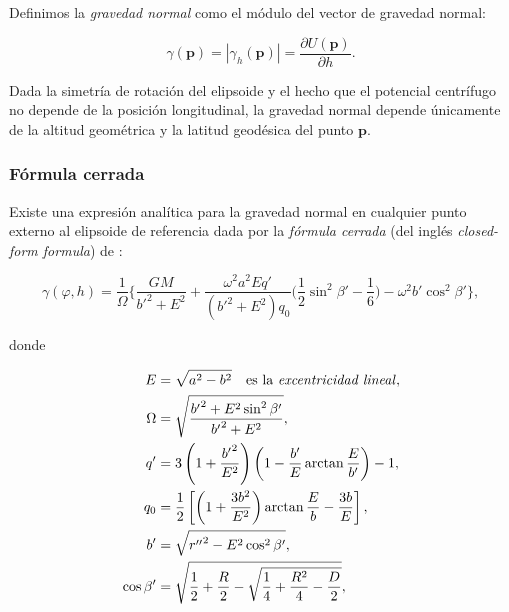 Definimos la \emph{gravedad normal} como el módulo del vector de gravedad
normal:

\begin{equation}
    \gamma(\mathbf{p}) = | \gamma_h(\mathbf{p}) | =
        \frac{\partial U(\mathbf{p})}{\partial h}.
\end{equation}

Dada la simetría de rotación del elipsoide y el hecho que el potencial
centrífugo no depende de la posición longitudinal, la gravedad normal depende
únicamente de la altitud geométrica y la latitud geodésica del punto
$\mathbf{p}$.

\subsubsection{Fórmula cerrada}

Existe una expresión analítica para la gravedad normal en cualquier punto
externo al elipsoide de referencia dada por la \emph{fórmula cerrada} (del
inglés \emph{closed-form formula}) de \citet{li2001}:


\begin{equation}
    \gamma(\varphi, h) =
    \frac{1}{\Omega}
    \Bigg\{
        \frac{G M}{{b'}^2 + E^2}
        + \frac{\omega^2 a^2 E q'}{({b'}^2 + E^2) q_0}
        \Bigg(
            \frac{1}{2}
            \sin^2 \beta' - \frac{1}{6}
        \Bigg)
        - \omega^2 b' \cos^2 \beta'
    \Bigg\},
    \label{eq:normal-gravity-closed-form}
\end{equation}

\noindent donde

\begin{align}
    E &= \sqrt{a^2 - b^2}
        \quad \text{es la \emph{excentricidad lineal}}, \\
    \Omega &= \sqrt{\frac{{b'}^2 + E^2 \sin^2 \beta'}{{b'}^2 + E^2}}, \\
    q' &= 3
        \left(1 + \frac{{b'}^2}{E^2} \right)
        \left(1 - \frac{b'}{E} \arctan \frac{E}{b'} \right)
        - 1, \\
    q_0 &= \frac{1}{2}
        \left[
            \left(
                1 + \frac{3b^2}{E^2}
            \right)
            \arctan \frac{E}{b} - \frac{3b}{E}
        \right], \\
    b' &= \sqrt{{r''}^2 - E^2 \cos^2 \beta'}, \\
    \cos \beta' &= \sqrt{
        \frac{1}{2}
        + \frac{R}{2}
        - \sqrt{
            \frac{1}{4} + \frac{R^2}{4}  - \frac{D}{2}
        }
    },
\end{align}

